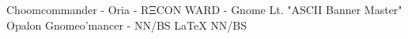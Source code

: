 Choomcommander - Oria - RΞCON WARD - Gnome Lt. "ASCII Banner Master"
             Opalon Gnomeo'mancer - NN/BS LaTeX{} NN/BS

